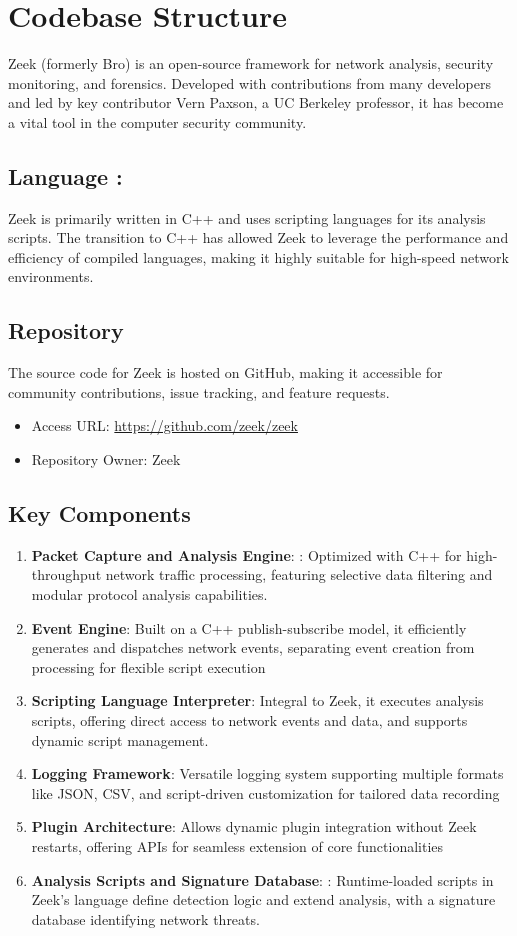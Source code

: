 \section{Codebase Structure}
Zeek (formerly Bro) is an open-source framework for network analysis, security monitoring, and forensics. Developed with contributions from many developers and led by key contributor Vern Paxson, a UC Berkeley professor, it has become a vital tool in the computer security community.
\subsection{Language :}
Zeek is primarily written in C++ and uses scripting languages for its analysis scripts. The transition to C++ has allowed Zeek to leverage the performance and efficiency of compiled languages, making it highly suitable for high-speed network environments.

\subsection{Repository}
The source code for Zeek is hosted on GitHub, making it accessible for community contributions, issue tracking, and feature requests.
\begin{itemize}
\item Access URL: \url{https://github.com/zeek/zeek}
\item Repository Owner: Zeek
\end{itemize}

\subsection{Key Components}
\begin{enumerate}
    \item \textbf{Packet Capture and Analysis Engine}: : Optimized with C++ for high-throughput network traffic processing, featuring selective data filtering and modular protocol analysis capabilities.
    \item \textbf{Event Engine}: Built on a C++ publish-subscribe model, it efficiently generates and dispatches network events, separating event creation from processing for flexible script execution
    \item \textbf{Scripting Language Interpreter}: Integral to Zeek, it executes analysis scripts, offering direct access to network events and data, and supports dynamic script management.
    \item \textbf{Logging Framework}: Versatile logging system supporting multiple formats like JSON, CSV, and script-driven customization for tailored data recording
    \item \textbf{Plugin Architecture}: Allows dynamic plugin integration without Zeek restarts, offering APIs for seamless extension of core functionalities
    \item \textbf{Analysis Scripts and Signature Database}: : Runtime-loaded scripts in Zeek's language define detection logic and extend analysis, with a signature database identifying network threats.
  
    
\end{enumerate}
